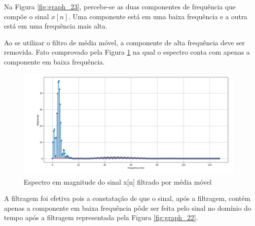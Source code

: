 Na Figura \ref{fig:graph_23}, percebe-se as duas componentes de frequência que compõe o sinal $x[n]$. Uma componente está em uma baixa frequência e a outra está em uma frequência mais alta. 

Ao se utilizar o filtro de média móvel, a componente de alta frequência deve ser removida. Fato comprovado pela Figura \ref{fig:graph_24} na qual o espectro conta com apenas a componente em baixa frequência. 

\begin{figure}[!htb]
    \centering
    \includegraphics[width=\linewidth]{Imagens/fig24.png}
    \caption{Espectro em magnitude do sinal x[n] filtrado por média móvel}
    \label{fig:graph_24}
\end{figure}

A filtragem foi efetiva pois a constatação de que o sinal, após a filtragem, contém apenas a componente em baixa frequência pôde ser feita pelo sinal no domínio do tempo após a filtragem representada pela Figura \ref{fig:graph_22}.